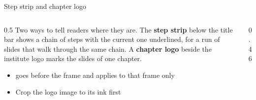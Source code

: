 
\begin{standardframe}{Step strip and chapter logo}
	\begin{columns}[t,onlytextwidth]
		\begin{column}{0.5\linewidth}
			\small
			Two ways to tell readers where they are. The \textbf{step strip} below
			the title bar shows a chain of steps with the current one underlined,
			for a run of slides that walk through the same chain. A \textbf{chapter
			logo} beside the institute logo marks the slides of one chapter.
			\par\medskip
			\begin{itemize}
				\item {} goes before the frame and applies to that frame only
				\item Crop the logo image to its ink first
			\end{itemize}
		\end{column}
		\begin{column}{0.46\linewidth}
		\end{column}
	\end{columns}
\end{standardframe}
